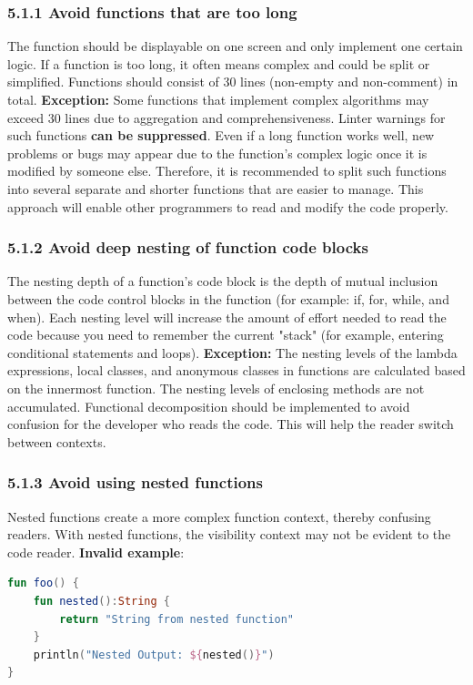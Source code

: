 \subsubsection*{\textbf{5.1.1 Avoid functions that are too long}}
\leavevmode\newline
\label{sec:5.1.1}
The function should be displayable on one screen and only implement one certain logic.
If a function is too long, it often means complex and could be split or simplified. Functions should consist of 30 lines (non-empty and non-comment) in total.
\textbf{Exception:} Some functions that implement complex algorithms may exceed 30 lines due to aggregation and comprehensiveness.
Linter warnings for such functions \textbf{can be suppressed}. 
Even if a long function works well, new problems or bugs may appear due to the function's complex logic once it is modified by someone else.
Therefore, it is recommended to split such functions into several separate and shorter functions that are easier to manage.
This approach will enable other programmers to read and modify the code properly.
\subsubsection*{\textbf{5.1.2 Avoid deep nesting of function code blocks}}
\leavevmode\newline
\label{sec:5.1.2}
The nesting depth of a function's code block is the depth of mutual inclusion between the code control blocks in the function (for example: if, for, while, and when).
Each nesting level will increase the amount of effort needed to read the code because you need to remember the current "stack" (for example, entering conditional statements and loops). 
\textbf{Exception:} The nesting levels of the lambda expressions, local classes, and anonymous classes in functions are calculated based on the innermost function. The nesting levels of enclosing methods are not accumulated.
Functional decomposition should be implemented to avoid confusion for the developer who reads the code.
This will help the reader switch between contexts.
\subsubsection*{\textbf{5.1.3 Avoid using nested functions}}
\leavevmode\newline
\label{sec:5.1.3}
Nested functions create a more complex function context, thereby confusing readers.
With nested functions, the visibility context may not be evident to the code reader.
\textbf{Invalid example}:
\begin{lstlisting}[language=Kotlin]
fun foo() { 
    fun nested():String { 
        return "String from nested function" 
    } 
    println("Nested Output: ${nested()}") 
} 
\end{lstlisting}

